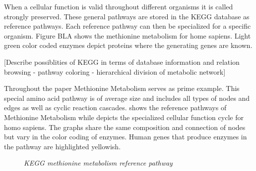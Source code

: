 When a cellular function is valid throughout different organisms it is called strongly preserved. These general pathways are stored in the KEGG database as reference pathways. Each reference pathway can then be specialized for a specific organism. Figure BLA shows the methionine metabolism for home sapiens. Light green color coded enzymes depict proteins where the generating genes are known. 

[Describe possiblities of KEGG in terms of database information and relation browsing - pathway coloring - hierarchical division of metabolic network]

Throughout the paper Methionine Metabolism serves as prime example. This special amino acid pathway is of average size and includes all types of nodes and edges as well as cyclic reaction cascades.  shows the reference pathways of Methionine Metabolism while  depicts the specialized cellular function cycle for homo sapiens. The graphs share the same composition and connection of nodes but vary in the color coding of enzymes. Human genes that produce enzymes in the pathway are highlighted yellowish. 

\begin{figure}[ht]
\centering
{} 
\caption[KEGG methionine metabolism reference pathway]{\textit{KEGG methionine metabolism reference pathway}} 
\label{gfx:KEGG_methionine_metabolism_271_reference_pathway}
\end{figure}

